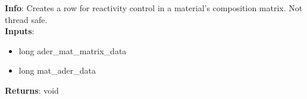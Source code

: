 \textbf{Info}: Creates a row for reactivity control in a material's composition
matrix. Not thread safe. \\

\noindent \textbf{Inputs}:
\begin{itemize}
\item{long ader\_mat\_matrix\_data}
\item{long mat\_ader\_data}
\end{itemize}

\noindent \textbf{Returns}: void
